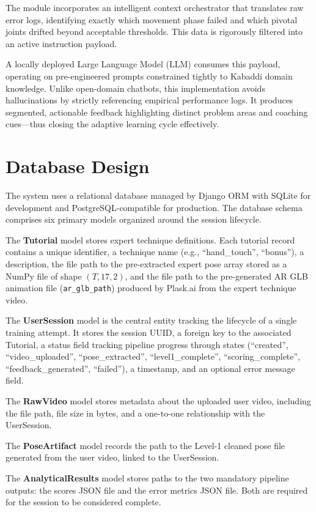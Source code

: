 \begin{sloppypar}
The module incorporates an intelligent context orchestrator that translates raw error logs, identifying exactly which movement phase failed and which pivotal joints drifted beyond acceptable thresholds. This data is rigorously filtered into an active instruction payload.

A locally deployed Large Language Model (LLM) consumes this payload, operating on pre-engineered prompts constrained tightly to Kabaddi domain knowledge. Unlike open-domain chatbots, this implementation avoids hallucinations by strictly referencing empirical performance logs. It produces segmented, actionable feedback highlighting distinct problem areas and coaching cues—thus closing the adaptive learning cycle effectively.

\section{Database Design}

The system uses a relational database managed by Django ORM with SQLite for development and PostgreSQL-compatible for production. The database schema comprises six primary models organized around the session lifecycle.

The \textbf{Tutorial} model stores expert technique definitions. Each tutorial record contains a unique identifier, a technique name (e.g., ``hand\_touch'', ``bonus''), a description, the file path to the pre-extracted expert pose array stored as a NumPy file of shape $(T, 17, 2)$, and the file path to the pre-generated AR GLB animation file (\texttt{ar\_glb\_path}) produced by Plask.ai from the expert technique video.

The \textbf{UserSession} model is the central entity tracking the lifecycle of a single training attempt. It stores the session UUID, a foreign key to the associated Tutorial, a status field tracking pipeline progress through states (``created'', ``video\_uploaded'', ``pose\_extracted'', ``level1\_complete'', ``scoring\_complete'', ``feedback\_generated'', ``failed''), a timestamp, and an optional error message field.

The \textbf{RawVideo} model stores metadata about the uploaded user video, including the file path, file size in bytes, and a one-to-one relationship with the UserSession.

The \textbf{PoseArtifact} model records the path to the Level-1 cleaned pose file generated from the user video, linked to the UserSession.

The \textbf{AnalyticalResults} model stores paths to the two mandatory pipeline outputs: the scores JSON file and the error metrics JSON file. Both are required for the session to be considered complete.


\end{sloppypar}
